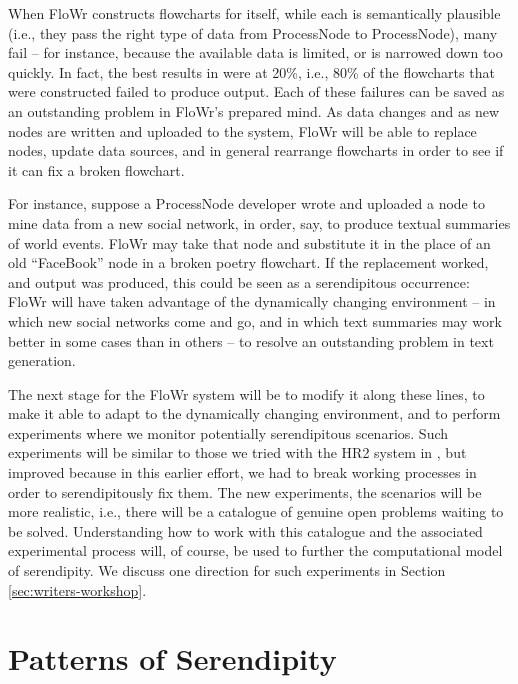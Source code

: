 \documentclass{llncs}
\begin{document}
When {\sf FloWr} constructs flowcharts for itself, while each is
semantically plausible (i.e., they pass the right type of data from
ProcessNode to ProcessNode), many fail -- for instance, because the
available data is limited, or is narrowed down too quickly.  In fact,
the best results in \cite{charnley2014flowr} were at 20\%, i.e., 80\%
of the flowcharts that were constructed failed to produce output.
Each of these failures can be saved as an outstanding problem in {\sf
  FloWr}'s prepared mind.  As data changes and as new nodes are
written and uploaded to the system, {\sf FloWr} will be able to replace nodes,
update data sources, and in general rearrange flowcharts in order to
see if it can fix a broken flowchart.

For instance, suppose a ProcessNode developer wrote and uploaded a
node to mine data from a new social network, in order, say, to produce
textual summaries of world events.  {\sf FloWr} may take that node
and substitute it in the place of an old ``FaceBook'' node in a broken
poetry flowchart. If the replacement worked, and output was produced,
this could be seen as a serendipitous occurrence: {\sf FloWr} will
have taken advantage of the dynamically changing environment -- in
which new social networks come and go, and in which text summaries may
work better in some cases than in others -- to resolve an outstanding
problem in text generation.

The next stage for the {\sf FloWr} system will be to modify it along
these lines, to make it able to adapt to the dynamically changing
environment, and to perform experiments where we monitor potentially
serendipitous scenarios. Such experiments will be similar to those we
tried with the HR2 system in \cite{pease2013discussion}, but improved
because in this earlier effort, we had to break working processes in
order to serendipitously fix them.  The new experiments, the scenarios
will be more realistic, i.e., there will be a catalogue of genuine
open problems waiting to be solved.  Understanding how to work with
this catalogue and the associated experimental process will, of
course, be used to further the computational model of serendipity.  We
discuss one direction for such experiments in Section
\ref{sec:writers-workshop}.

\section{Patterns of Serendipity} \label{sec:patterns-of-serendipity}
\end{document}
